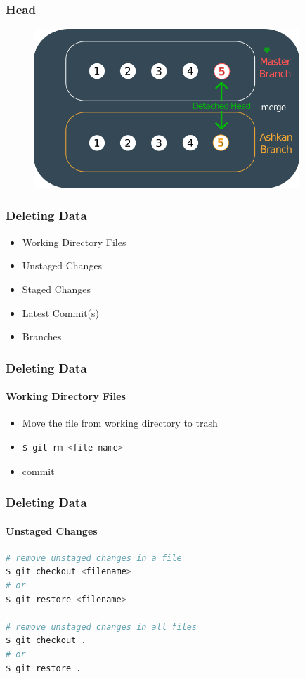 \documentclass{beamer}
\begin{document}
	\begin{frame}
		\frametitle{Head}
		\begin{figure}[htbp]
			\centering
			\includegraphics[width=10cm]{head16}
		\end{figure}
	\end{frame}
	
	\begin{frame}
		\frametitle{Deleting Data}
		\begin{itemize}
			\item Working Directory Files
			\item Unstaged Changes
			\item Staged Changes
			\item Latest Commit(s)
			\item Branches
		\end{itemize}
	\end{frame}
	
	\begin{frame}[fragile]
		\frametitle{Deleting Data}
		\framesubtitle{Working Directory Files}
		
		\begin{itemize}
			\item Move the file from working directory to trash
			\item 
\begin{lstlisting}[language=bash]
$ git rm <file name>
\end{lstlisting}
			\item commit
		\end{itemize}
	\end{frame}
	
	\begin{frame}[fragile]
		\frametitle{Deleting Data}
		\framesubtitle{Unstaged Changes}
		
\begin{lstlisting}[language=bash]
# remove unstaged changes in a file
$ git checkout <filename>
# or
$ git restore <filename>

# remove unstaged changes in all files
$ git checkout .
# or
$ git restore .
\end{lstlisting}
	\end{frame}
\end{document}
